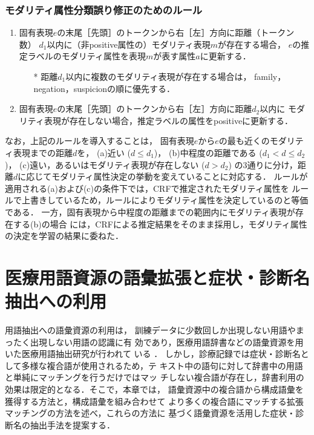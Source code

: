 \documentclass[japanese]{jnlp_1.4}
\begin{document}
\subsubsection*{モダリティ属性分類誤り修正のためのルール}

\begin{enumerate}
 \item 固有表現$e$の末尾［先頭］のトークンから右［左］方向に距離（トークン数）
       $d_1$以内に（非positive属性の）モダリティ表現$m$が存在する場合，
       $e$の推定ラベルのモダリティ属性を表現$m$が表す属性$a$に更新する．
       \begin{itemize}
	\item[*] 距離$d_1$以内に複数のモダリティ表現が存在する場合は，
	      family，negation，suspicionの順に優先する．
       \end{itemize}
 \item 固有表現$e$の末尾［先頭］のトークンから右［左］方向に距離$d_2$以内に
       モダリティ表現が存在しない場合，推定ラベルの属性をpositiveに更新する．
\end{enumerate}

なお，上記のルールを導入することは，
固有表現$e$から$e$の最も近くのモダリティ表現までの距離$d$を，
(a)近い ($d \leq d_1$)，
(b)中程度の距離である ($d_1 < d \leq d_2$)，
(c)遠い，あるいはモダリティ表現が存在しない ($d > d_2$)
の3通りに分け，距離$d$に応じてモダリティ属性決定の挙動を変えていることに対応する．
ルールが適用される(a)および(c)の条件下では，CRFで推定されたモダリティ属性を
ルールで上書きしているため，ルールによりモダリティ属性を決定しているのと等価である．
一方，固有表現から中程度の距離までの範囲内にモダリティ表現が存在する(b)の場合
には，CRFによる推定結果をそのまま採用し，モダリティ属性の決定を学習の結果に委ねた．


\section{医療用語資源の語彙拡張と症状・診断名抽出への利用}
\label{chp:util_resources}

用語抽出への語彙資源の利用は，
訓練データに少数回しか出現しない用語やまったく出現しない用語の認識に有
効であり，医療用語辞書などの語彙資源を用いた医療用語抽出研究が行われて
いる
\cite{imaichi2013comparison,laquerre2013necla,miura2013incorporating}．
しかし，診療記録では症状・診断名として多様な複合語が使用されるため，テ
キスト中の語句に対して辞書中の用語と単純にマッチングを行うだけではマッ
チしない複合語が存在し，辞書利用の効果は限定的となる．そこで，本章では，
語彙資源中の複合語から構成語彙を獲得する方法と，構成語彙を組み合わせて
より多くの複合語にマッチする拡張マッチングの方法を述べ，これらの方法に
基づく語彙資源を活用した症状・診断名の抽出手法を提案する．
\end{document}
